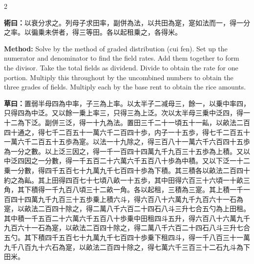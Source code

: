 \documentclass[11pt,a4paper]{article}
\newcommand{\MethodText}[1]{\par\noindent\textbf{\color{methodcolor}術曰：}#1\par}
\newcommand{\WorkingText}[1]{\par\noindent\textbf{草曰：}#1\par}
\newcommand{\MethodEn}[1]{\par\noindent\textbf{\color{methodcolor}Method:} #1\par}
\begin{document}
\begin{paracol}{2}
\MethodText{以衰分求之。列母子求田率，副併為法，以共田為寔，寔如法而一，得一分之率。以徧乗未併者，得三等田。各以起租乗之，各得米。}
\switchcolumn
\MethodEn{Solve by the method of graded distribution (cui fen). Set up the numerator and denominator to find the field rates. Add them together to form the divisor. Take the total fields as dividend. Divide to obtain the rate for one portion. Multiply this throughout by the uncombined numbers to obtain the three grades of fields. Multiply each by the base rent to obtain the rice amounts.}
\switchcolumn*

\WorkingText{置弱半母四為中率，子三為上率。以太半子二减母三，餘一，以乗中率四，只得四為中泛。又以餘一乗上率三，只得三為上泛。次以太半母三乗中泛四，得一十二為下泛。副併三泛，得一十九為法。置田三千二十一頃五十一畆，以畝法二百四十通之，得七千二百五十一萬六千二百四十歩，内子一十五歩，得七千二百五十一萬六千二百五十五歩為寔。以法一十九除之，得三百八十一萬六千六百四十五歩為一分之數。以上泛三因之，得一千一百四十四萬九千九百三十五歩為上積。又以中泛四因之一分數，得一千五百二十六萬六千五百八十歩為中積。又以下泛一十二乗一分數，得四千五百七十九萬九千七百四十歩為下積。其三積各以畝法二百四十約之為畆。其上田得四百七十七頃八畝一十五歩，其中田得六百三十六頃一十畝三角，其下積得一千九百八頃三十二畝一角。各以起租，三積為三寔。其上積一千一百四十四萬九千九百三十五歩乗上積六斗，得六百八十六萬九千九百六十一石為寔，以畝法二百四十除之，得二萬八千六百二十四石八斗三升七合五勺為上田租。其中積一千五百二十六萬六千五百八十歩乗中田租四斗五升，得六百八十六萬九千九百六十一石為寔，以畝法二百四十除之，得二萬八千六百二十四石八斗三升七合五勺。其下積四千五百七十九萬九千七百四十歩乗下租四斗，得一千八百三十一萬九千八百九十六石為寔，以畝法二百四十除之，得七萬六千三百三十二石九斗為下田米。}
\switchcolumn

\end{paracol}
\end{document}
